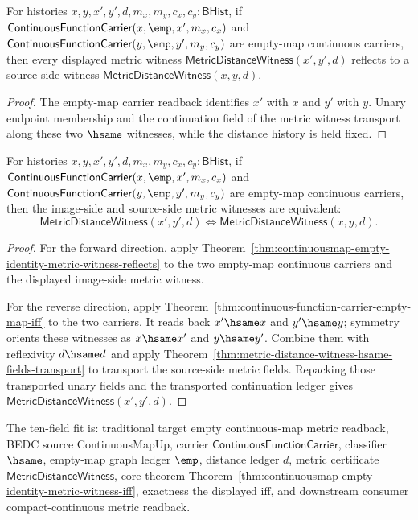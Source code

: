 \begin{theorem}
\label{thm:continuousmap-empty-identity-metric-witness-reflects}
For histories $x,y,x',y',d,m_x,m_y,c_x,c_y:\mathsf{BHist}$, if
$\mathsf{ContinuousFunctionCarrier}(x,\emp,x',m_x,c_x)$ and
$\mathsf{ContinuousFunctionCarrier}(y,\emp,y',m_y,c_y)$ are empty-map
continuous carriers, then every displayed metric witness
$\mathsf{MetricDistanceWitness}(x',y',d)$ reflects to a source-side witness
$\mathsf{MetricDistanceWitness}(x,y,d)$.
\end{theorem}
\begin{proof}
The empty-map carrier readback identifies $x'$ with $x$ and $y'$ with $y$.
Unary endpoint membership and the continuation field of the metric witness
transport along these two $\hsame$ witnesses, while the distance history is
held fixed.
\end{proof}

\begin{theorem}
\label{thm:continuousmap-empty-identity-metric-witness-iff}
For histories $x,y,x',y',d,m_x,m_y,c_x,c_y:\mathsf{BHist}$, if
$\mathsf{ContinuousFunctionCarrier}(x,\emp,x',m_x,c_x)$ and
$\mathsf{ContinuousFunctionCarrier}(y,\emp,y',m_y,c_y)$ are empty-map
continuous carriers, then the image-side and source-side metric witnesses are
equivalent:
$$
\mathsf{MetricDistanceWitness}(x',y',d)\Longleftrightarrow
\mathsf{MetricDistanceWitness}(x,y,d).
$$
\end{theorem}
\begin{proof}
For the forward direction, apply
Theorem~\ref{thm:continuousmap-empty-identity-metric-witness-reflects} to the
two empty-map continuous carriers and the displayed image-side metric witness.

For the reverse direction, apply
Theorem~\ref{thm:continuous-function-carrier-empty-map-iff} to the two
carriers. It reads back $x'\hsame x$ and $y'\hsame y$; symmetry orients these
witnesses as $x\hsame x'$ and $y\hsame y'$. Combine them with reflexivity
$d\hsame d$ and apply
Theorem~\ref{thm:metric-distance-witness-hsame-fields-transport} to transport
the source-side metric fields. Repacking those transported unary fields and
the transported continuation ledger gives
$\mathsf{MetricDistanceWitness}(x',y',d)$.
\end{proof}

The ten-field fit is: traditional target empty continuous-map metric readback,
BEDC source ContinuousMapUp, carrier $\mathsf{ContinuousFunctionCarrier}$,
classifier $\hsame$, empty-map graph ledger $\emp$, distance ledger $d$,
metric certificate $\mathsf{MetricDistanceWitness}$, core theorem
Theorem~\ref{thm:continuousmap-empty-identity-metric-witness-iff}, exactness
the displayed iff, and downstream consumer compact-continuous metric readback.

